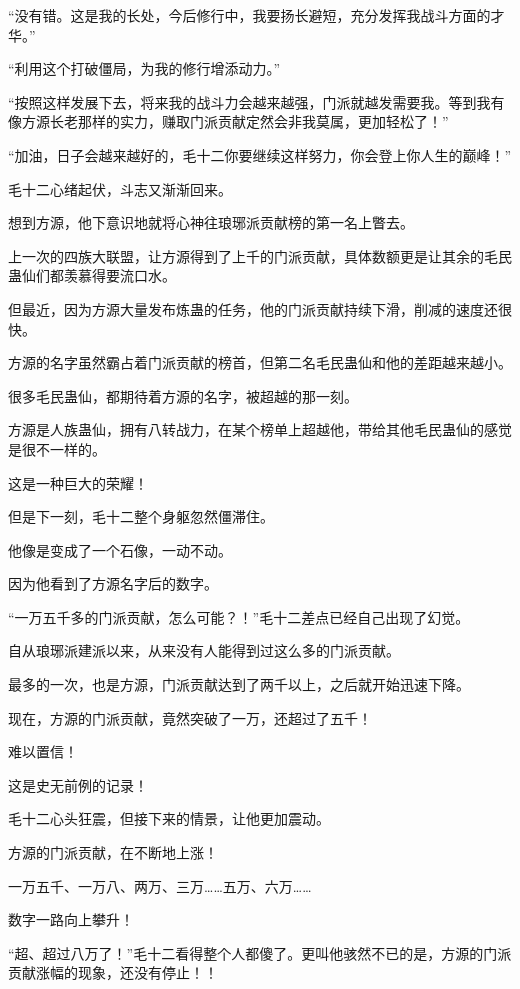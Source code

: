 
\begin{this_body}

“没有错。这是我的长处，今后修行中，我要扬长避短，充分发挥我战斗方面的才华。”

“利用这个打破僵局，为我的修行增添动力。”

“按照这样发展下去，将来我的战斗力会越来越强，门派就越发需要我。等到我有像方源长老那样的实力，赚取门派贡献定然会非我莫属，更加轻松了！”

“加油，日子会越来越好的，毛十二你要继续这样努力，你会登上你人生的巅峰！”

毛十二心绪起伏，斗志又渐渐回来。

想到方源，他下意识地就将心神往琅琊派贡献榜的第一名上瞥去。

上一次的四族大联盟，让方源得到了上千的门派贡献，具体数额更是让其余的毛民蛊仙们都羡慕得要流口水。

但最近，因为方源大量发布炼蛊的任务，他的门派贡献持续下滑，削减的速度还很快。

方源的名字虽然霸占着门派贡献的榜首，但第二名毛民蛊仙和他的差距越来越小。

很多毛民蛊仙，都期待着方源的名字，被超越的那一刻。

方源是人族蛊仙，拥有八转战力，在某个榜单上超越他，带给其他毛民蛊仙的感觉是很不一样的。

这是一种巨大的荣耀！

但是下一刻，毛十二整个身躯忽然僵滞住。

他像是变成了一个石像，一动不动。

因为他看到了方源名字后的数字。

“一万五千多的门派贡献，怎么可能？！”毛十二差点已经自己出现了幻觉。

自从琅琊派建派以来，从来没有人能得到过这么多的门派贡献。

最多的一次，也是方源，门派贡献达到了两千以上，之后就开始迅速下降。

现在，方源的门派贡献，竟然突破了一万，还超过了五千！

难以置信！

这是史无前例的记录！

毛十二心头狂震，但接下来的情景，让他更加震动。

方源的门派贡献，在不断地上涨！

一万五千、一万八、两万、三万……五万、六万……

数字一路向上攀升！

“超、超过八万了！”毛十二看得整个人都傻了。更叫他骇然不已的是，方源的门派贡献涨幅的现象，还没有停止！！


\end{this_body}
